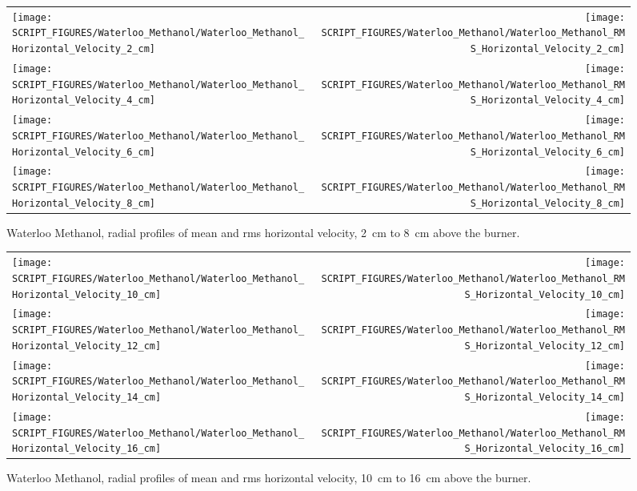 \begin{figure}[p]
\begin{tabular*}{\textwidth}{l@{\extracolsep{\fill}}r}
\texttt{[image: SCRIPT\_FIGURES/Waterloo\_Methanol/Waterloo\_Methanol\_Horizontal\_Velocity\_2\_cm]} &
\texttt{[image: SCRIPT\_FIGURES/Waterloo\_Methanol/Waterloo\_Methanol\_RMS\_Horizontal\_Velocity\_2\_cm]} \\
\texttt{[image: SCRIPT\_FIGURES/Waterloo\_Methanol/Waterloo\_Methanol\_Horizontal\_Velocity\_4\_cm]} &
\texttt{[image: SCRIPT\_FIGURES/Waterloo\_Methanol/Waterloo\_Methanol\_RMS\_Horizontal\_Velocity\_4\_cm]} \\
\texttt{[image: SCRIPT\_FIGURES/Waterloo\_Methanol/Waterloo\_Methanol\_Horizontal\_Velocity\_6\_cm]} &
\texttt{[image: SCRIPT\_FIGURES/Waterloo\_Methanol/Waterloo\_Methanol\_RMS\_Horizontal\_Velocity\_6\_cm]} \\
\texttt{[image: SCRIPT\_FIGURES/Waterloo\_Methanol/Waterloo\_Methanol\_Horizontal\_Velocity\_8\_cm]} &
\texttt{[image: SCRIPT\_FIGURES/Waterloo\_Methanol/Waterloo\_Methanol\_RMS\_Horizontal\_Velocity\_8\_cm]}
\end{tabular*}
\caption[Waterloo Methanol, radial mean and rms horz.~vel., 2~cm to 8~cm above burner]
{Waterloo Methanol, radial profiles of mean and rms horizontal velocity, 2~cm to 8~cm above the burner.}
\label{Water_Methanol_Hori_Vel_1}
\end{figure}

\begin{figure}[p]
\begin{tabular*}{\textwidth}{l@{\extracolsep{\fill}}r}
\texttt{[image: SCRIPT\_FIGURES/Waterloo\_Methanol/Waterloo\_Methanol\_Horizontal\_Velocity\_10\_cm]} &
\texttt{[image: SCRIPT\_FIGURES/Waterloo\_Methanol/Waterloo\_Methanol\_RMS\_Horizontal\_Velocity\_10\_cm]} \\
\texttt{[image: SCRIPT\_FIGURES/Waterloo\_Methanol/Waterloo\_Methanol\_Horizontal\_Velocity\_12\_cm]} &
\texttt{[image: SCRIPT\_FIGURES/Waterloo\_Methanol/Waterloo\_Methanol\_RMS\_Horizontal\_Velocity\_12\_cm]} \\
\texttt{[image: SCRIPT\_FIGURES/Waterloo\_Methanol/Waterloo\_Methanol\_Horizontal\_Velocity\_14\_cm]} &
\texttt{[image: SCRIPT\_FIGURES/Waterloo\_Methanol/Waterloo\_Methanol\_RMS\_Horizontal\_Velocity\_14\_cm]} \\
\texttt{[image: SCRIPT\_FIGURES/Waterloo\_Methanol/Waterloo\_Methanol\_Horizontal\_Velocity\_16\_cm]} &
\texttt{[image: SCRIPT\_FIGURES/Waterloo\_Methanol/Waterloo\_Methanol\_RMS\_Horizontal\_Velocity\_16\_cm]}
\end{tabular*}
\caption[Waterloo Methanol, radial mean and rms horz.~vel., 10~cm to 16~cm above burner]
{Waterloo Methanol, radial profiles of mean and rms horizontal velocity, 10~cm to 16~cm above the burner.}
\label{Water_Methanol_Hori_Vel_2}
\end{figure}

